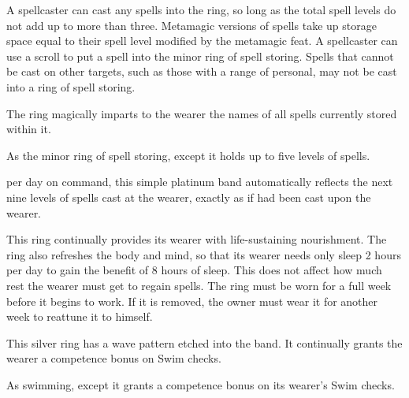 A spellcaster can cast any spells into the ring, so long as the total spell levels do not add up to more than three. Metamagic versions of spells take up storage space equal to their spell level modified by the metamagic feat. A spellcaster can use a scroll to put a spell into the minor ring of spell storing. Spells that cannot be cast on other targets, such as those with a range of personal, may not be cast into a ring of spell storing.

The ring magically imparts to the wearer the names of all spells currently stored within it.


 As the minor ring of spell storing, except it holds up to five levels of spells.


  per day on command, this simple platinum band automatically reflects the next nine levels of spells cast at the wearer, exactly as if  had been cast upon the wearer.


 This ring continually provides its wearer with life-sustaining nourishment. The ring also refreshes the body and mind, so that its wearer needs only sleep 2 hours per day to gain the benefit of 8 hours of sleep. This does not affect how much rest the wearer must get to regain spells. The ring must be worn for a full week before it begins to work. If it is removed, the owner must wear it for another week to reattune it to himself.


 This silver ring has a wave pattern etched into the band. It continually grants the wearer a  competence bonus on Swim checks.


 As swimming, except it grants a  competence bonus on its wearer's Swim checks.

